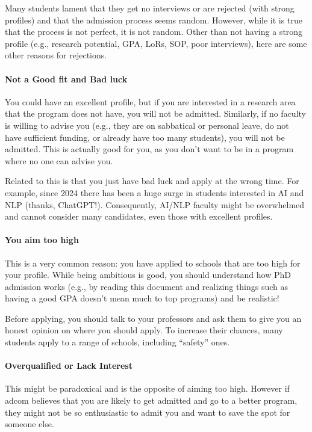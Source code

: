 \documentclass[oneside,11pt,dvipsnames]{book}
\def\sectioninfo#1{%
  \addcontentsline{toc}{sectioninfo}{%
    \noexpand\numberline{}\color{black}{#1}}%
}
\begin{document}
\sectioninfo{You aim too high, are overqualified, or even because you applied to AI/ML, a super competitive field in recent years with many applicants.}

Many students lament that they get no interviews or are rejected (with strong profiles) and that the admission process seems random.  However, while it is true that the process is not perfect, it is not random.
Other than not having a strong profile (e.g., research potential, GPA, LoRs, SOP, poor interviews), here are some other reasons for rejections.


\paragraph{Not a Good fit and Bad luck}  You could have an excellent profile, but if you are interested in a research area that the program does not have, you will not be admitted.
Similarly, if no faculty is willing to advise you (e.g., they are on sabbatical or personal leave, do not have sufficient funding, or already have too many students), you will not be admitted.  This is actually good for you, as you don't want to be in a program where no one can advise you.

Related to this is that you just have bad luck and apply at the wrong time.  For example, since 2024 there has been a huge surge in students interested in AI and NLP (thanks, ChatGPT!). Consequently, AI/NLP faculty might be overwhelmed and cannot consider many candidates, even those with excellent profiles.


\paragraph{You aim too high} This is a very common reason: you have applied to schools that are too high for your profile. While being ambitious is good, you should understand how PhD admission works (e.g., by reading this document and realizing things such as having a good GPA doesn't mean much to top programs) and be realistic! 

Before applying, you should talk to your professors and ask them to give you an honest opinion on where you should apply. To increase their chances, many students apply to a range of schools, including ``safety'' ones. 


\paragraph{Overqualified or Lack Interest}  This might be paradoxical and is the opposite of aiming too high. However if adcom believes that you are likely to get admitted and go to a better program, they might not be so enthusiastic to admit you and want to save the spot for someone else.
\end{document}
